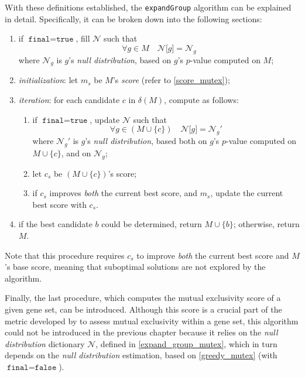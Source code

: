 With these definitions established, the \texttt{expandGroup} algorithm can be explained in detail. Specifically, it can be broken down into the following sections:

\begin{enumerate}
    \item if $\texttt{final} = \texttt{true}$, fill $\mathcal N$ such that $$\forall g \in M \quad \mathcal N \texttt{[}g\texttt{]} = \mathcal N_g$$ where $\mathcal N_g$ is $g$'s \textit{null distribution}, based on $g$'s $p$-value computed on $M$;
    \item \textit{initialization}: let $m_s$ be $M$'s \textit{score} (refer to \cref{score_mutex});
    \item \textit{iteration}: for each candidate $c$ in $\delta(M)$, compute as follows:
        \begin{enumerate}
            \item if $\texttt{final} = \texttt{true}$, update $\mathcal N$ such that $$\forall g \in (M \cup \{c\}) \quad \mathcal N \texttt{[}g\texttt{]} = \mathcal N_g'$$ where $\mathcal N_g'$ is $g$'s \textit{null distribution}, based both on $g$'s $p$-value computed on $M \cup \{c\}$, and on $\mathcal N_g$;
            \item let $c_s$ be $(M \cup \{c\})$'s score;
            \item if $c_s$ improves \textit{both} the current best score, and $m_s$, update the current best score with $c_s$.
        \end{enumerate}
    \item if the best candidate $b$ could be determined, return $M \cup \{b\}$; otherwise, return $M$.
\end{enumerate}

Note that this procedure requires $c_s$ to improve \textit{both} the current best score and $M$'s base score, meaning that suboptimal solutions are not explored by the algorithm.

Finally, the last procedure, which computes the mutual exclusivity score of a given gene set, can be introduced. Although this score is a crucial part of the metric developed by \textcite{mutex} to assess mutual exclusivity within a gene set, this algorithm could not be introduced in the previous chapter because it relies on the \textit{null distribution} dictionary $\mathcal{N}$, defined in \cref{expand_group_mutex}, which in turn depends on the \textit{null distribution} estimation, based on \cref{greedy_mutex} (with $\texttt{final} = \texttt{false}$).

